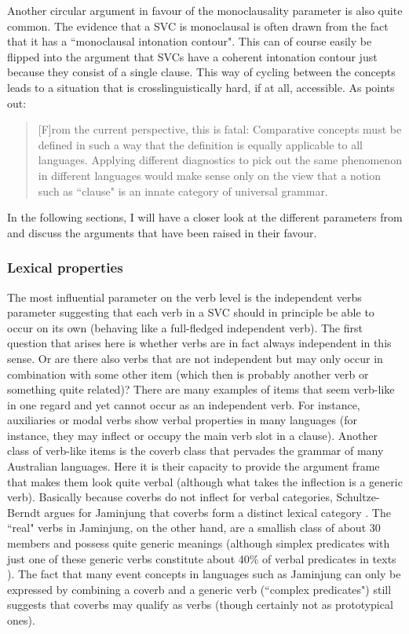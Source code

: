 Another circular argument in favour of the monoclausality parameter is also quite common. The evidence that a SVC is monoclausal is often drawn from the fact that it has a ``monoclausal intonation contour". This can of course easily be flipped into the argument that SVCs have a coherent intonation contour just because they consist of a single clause. This way of cycling between the concepts leads to a situation that is crosslinguistically hard, if at all, accessible. As \citet[299]{haspelmath2016serial} points out: 
\begin{quote}[F]rom the current perspective, this is fatal: Comparative concepts must be defined in such a way that the definition is equally applicable to all languages. Applying different diagnostics to pick out the same phenomenon in different languages would make sense only on the view that a notion such as ``clause" is an innate category of universal grammar.\end{quote}

In the following sections, I will have a closer look at the different parameters from  and discuss the arguments that have been raised in their favour.

\subsubsection{Lexical properties}\label{sec:lexprop}

The most influential parameter on the verb level is the independent verbs parameter suggesting that each verb in a SVC should in principle be able to occur on its own (behaving like a full-fledged independent verb). The first question that arises here is whether verbs are in fact always independent in this sense. Or are there also verbs that are not independent but may only occur in combination with some other item (which then is probably another verb or something quite related)? There are many examples of items that seem verb-like in one regard and yet cannot occur as an independent verb. For instance, auxiliaries or modal verbs show verbal properties in many languages (for instance, they may inflect or occupy the main verb slot in a clause). Another class of verb-like items is the coverb class that pervades the grammar of many Australian languages. Here it is their capacity to provide the argument frame that makes them look quite verbal (although what takes the inflection is a generic verb). Basically because coverbs do not inflect for verbal categories, Schultze-Berndt argues for Jaminjung that coverbs form a distinct lexical category \citep[71]{schultze2000simple}. The ``real" verbs in Jaminjung, on the other hand, are a smallish class of about 30 members and possess quite generic meanings (although simplex predicates with just one of these generic verbs constitute about 40\% of verbal predicates in texts \citealt[118]{schultze2000simple}). The fact that many event concepts in languages such as Jaminjung can only be expressed by combining a coverb and a generic verb (``complex predicates") still suggests that coverbs may qualify as verbs (though certainly not as prototypical ones).


